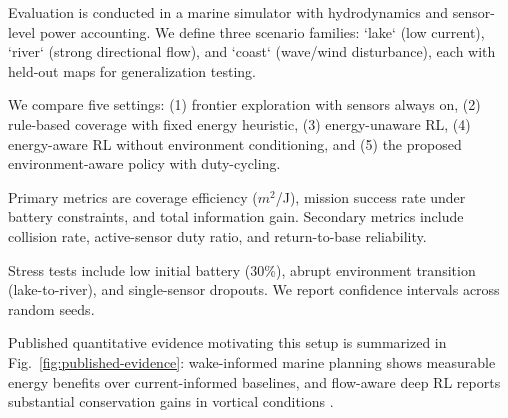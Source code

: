 Evaluation is conducted in a marine simulator with hydrodynamics and sensor-level power accounting. We define three scenario families: `lake` (low current), `river` (strong directional flow), and `coast` (wave/wind disturbance), each with held-out maps for generalization testing.

We compare five settings: (1) frontier exploration with sensors always on, (2) rule-based coverage with fixed energy heuristic, (3) energy-unaware RL, (4) energy-aware RL without environment conditioning, and (5) the proposed environment-aware policy with duty-cycling.

Primary metrics are coverage efficiency ($m^2$/J), mission success rate under battery constraints, and total information gain. Secondary metrics include collision rate, active-sensor duty ratio, and return-to-base reliability.

Stress tests include low initial battery (30\%), abrupt environment transition (lake-to-river), and single-sensor dropouts. We report confidence intervals across random seeds.

Published quantitative evidence motivating this setup is summarized in Fig.~\ref{fig:published-evidence}: wake-informed marine planning shows measurable energy benefits over current-informed baselines, and flow-aware deep RL reports substantial conservation gains in vortical conditions \cite{cooperbaldock2025wake,gadhvi2025khalasi}.
